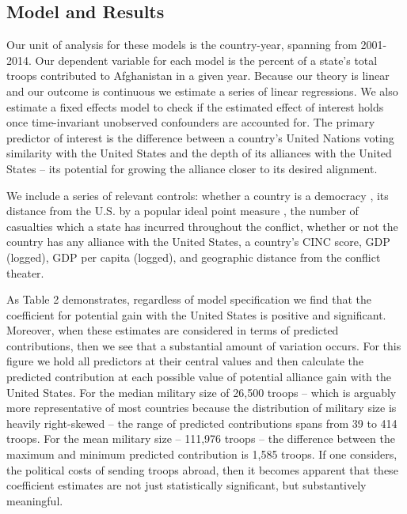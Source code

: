 \documentclass[12pt,letterpaper]{article}
\begin{document}
	\subsection{Model and Results}
		Our unit of analysis for these models is the country-year, spanning from 2001-2014. Our dependent variable for each model is the percent of a state's total troops contributed to Afghanistan in a given year. Because our theory is linear and our outcome is continuous we estimate a series of linear regressions. We also estimate a fixed effects model to check if the estimated effect of interest holds once time-invariant unobserved confounders are accounted for. The primary predictor of interest is the difference between a country's United Nations voting similarity with the United States and the depth of its alliances with the United States -- its potential for growing the alliance closer to its desired alignment.
		
		We include a series of relevant controls: whether a country is a democracy \citep{gartzke_whydemocraciesmay_2004}, its distance from the U.S. by a popular ideal point measure \citep{bailey_estimatingdynamicstate_2017}, the number of casualties which a state has incurred throughout the conflict, whether or not the country has any alliance with the United States, a country's CINC score, GDP (logged), GDP per capita (logged), and geographic distance from the conflict theater.
		
		

		As Table 2 demonstrates, regardless of model specification we find that the coefficient for potential gain with the United States is positive and significant. Moreover, when these estimates are considered in terms of predicted contributions, then we see that a substantial amount of variation occurs. For this figure we hold all predictors at their central values and then calculate the predicted contribution at each possible value of potential alliance gain with the United States. For the median military size of 26,500 troops -- which is arguably more representative of most countries because the distribution of military size is heavily right-skewed -- the range of predicted contributions spans from 39 to 414 troops. For the mean military size -- 111,976 troops -- the difference between the maximum and minimum predicted contribution is 1,585 troops. If one considers, the political costs of sending troops abroad, then it becomes apparent that these coefficient estimates are not just statistically significant, but substantively meaningful.
	
\end{document}
